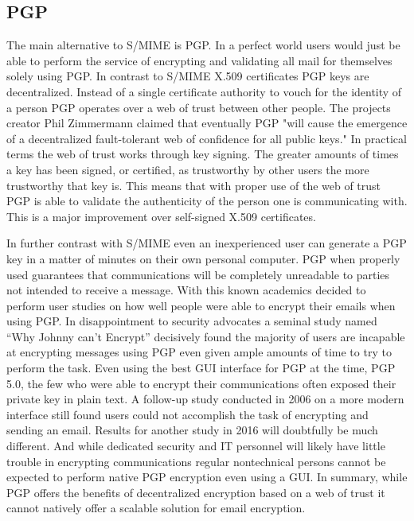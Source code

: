 \documentclass{article}
\begin{document}
\subsection{PGP}
\par The main alternative to S/MIME is PGP. In a perfect world users would just be able to perform the service of encrypting and validating all mail for themselves solely using PGP. In contrast to S/MIME X.509 certificates PGP keys are decentralized. Instead of a single certificate authority to vouch for the identity of a person PGP operates over a web of trust between other people. The projects creator Phil Zimmermann claimed that eventually PGP "will cause the emergence of a decentralized fault-tolerant web of confidence for all public keys."\cite{zimmermann1995official} In practical terms the web of trust works through key signing. The greater amounts of times a key has been signed, or certified, as trustworthy by other users the more trustworthy that key is\cite{garfinkel1995pgp}. This means that with proper use of the web of trust PGP is able to validate the authenticity of the person one is communicating with\cite{furnell2013usable}. This is a major improvement over self-signed X.509 certificates.
\par In further contrast with S/MIME even an inexperienced user can generate a PGP key in a matter of minutes on their own personal computer\cite{whitten1999johnny,zimmermann1995official}. PGP when properly used guarantees that communications will be completely unreadable to parties not intended to receive a message\cite{zimmermann1995official}. With this known academics decided to perform user studies on how well people were able to encrypt their emails when using PGP. In disappointment to security advocates a seminal study named “Why Johnny can't Encrypt” decisively found the majority of users are incapable at encrypting messages using PGP even given ample amounts of time to try to perform the task\cite{whitten1999johnny}. Even using the best GUI interface for PGP at the time, PGP 5.0, the few who were able to encrypt their communications often exposed their private key in plain text\cite{whitten1999johnny}. A follow-up study conducted in 2006 on a more modern interface still found users could not accomplish the task of encrypting and sending an email\cite{sheng2006johnny}. Results for another study in 2016 will doubtfully be much different. And while dedicated security and IT personnel will likely have little trouble in encrypting communications regular nontechnical persons cannot be expected to perform native PGP encryption even using a GUI. In summary, while PGP offers the benefits of decentralized encryption based on a web of trust it cannot natively offer a scalable solution for email encryption.
\end{document}
